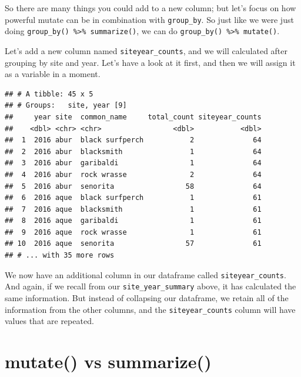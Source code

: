 \documentclass[]{book}
\newenvironment{Shaded}{\begin{snugshade}}{\end{snugshade}}
\newcommand{\DataTypeTok}[1]{\textcolor[rgb]{0.13,0.29,0.53}{#1}}
\newcommand{\KeywordTok}[1]{\textcolor[rgb]{0.13,0.29,0.53}{\textbf{#1}}}
\newcommand{\NormalTok}[1]{#1}
\newcommand{\OperatorTok}[1]{\textcolor[rgb]{0.81,0.36,0.00}{\textbf{#1}}}
\newcommand{\StringTok}[1]{\textcolor[rgb]{0.31,0.60,0.02}{#1}}
\begin{document}
So there are many things you could add to a new column; but let's focus on how powerful mutate can be in combination with \texttt{group\_by}. So just like we were just doing \texttt{group\_by()\ \%\textgreater{}\%\ summarize()}, we can do \texttt{group\_by()\ \%\textgreater{}\%\ mutate()}.

Let's add a new column named \texttt{siteyear\_counts}, and we will calculated after grouping by site and year. Let's have a look at it first, and then we will assign it as a variable in a moment.

\begin{Shaded}
\end{Shaded}

\begin{verbatim}
## # A tibble: 45 x 5
## # Groups:   site, year [9]
##     year site  common_name     total_count siteyear_counts
##    <dbl> <chr> <chr>                 <dbl>           <dbl>
##  1  2016 abur  black surfperch           2              64
##  2  2016 abur  blacksmith                1              64
##  3  2016 abur  garibaldi                 1              64
##  4  2016 abur  rock wrasse               2              64
##  5  2016 abur  senorita                 58              64
##  6  2016 aque  black surfperch           1              61
##  7  2016 aque  blacksmith                1              61
##  8  2016 aque  garibaldi                 1              61
##  9  2016 aque  rock wrasse               1              61
## 10  2016 aque  senorita                 57              61
## # ... with 35 more rows
\end{verbatim}

We now have an additional column in our dataframe called \texttt{siteyear\_counts}. And again, if we recall from our \texttt{site\_year\_summary} above, it has calculated the same information. But instead of collapsing our dataframe, we retain all of the information from the other columns, and the \texttt{siteyear\_counts} column will have values that are repeated.

\hypertarget{mutate-vs-summarize}{%
\section{mutate() vs summarize()}\label{mutate-vs-summarize}}
\end{document}
